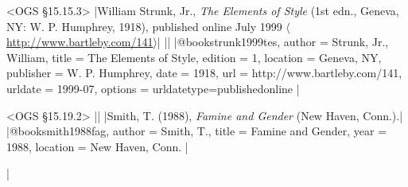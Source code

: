 \documentclass[extrafontsizes,11pt,a4paper,oneside]{memoir}
\begin{document}
\bibexample<OGS \S15.15.3>
|William Strunk, Jr., \emph{The Elements of Style} (1st edn., Geneva, NY: W. P. Humphrey, 1918), published online July 1999 $\langle$\url{http://www.bartleby.com/141}$\rangle$|%
||%
|@book{strunk1999tes,
  author = {Strunk, Jr., William},
  title = {The Elements of Style},
  edition = {1},
  location = {Geneva, NY},
  publisher = {W. P. Humphrey},
  date = {1918},
  url = {http://www.bartleby.com/141},
  urldate = {1999-07},
  options = {urldatetype=published{\space}online}
}|

\bibexample<OGS \S15.19.2>
||%
|Smith, T. (1988), \emph{Famine and Gender} (New Haven, Conn.).|%
|@book{smith1988fag,
  author = {Smith, T.},
  title = {Famine and Gender},
  year = {1988},
  location = {New Haven, Conn.}
}|



\todoc|
\printbibliography[notcategory=reviewed]
\end{document}
